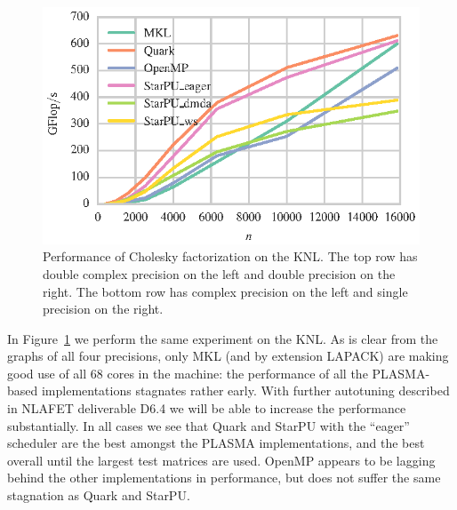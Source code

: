 \documentclass[a4paper,12pt]{article}
\begin{document}
\begin{figure}[t]
  \includegraphics[scale=.85]{fig/knl_ram_spotrf_weak_scaling.eps}
  \caption{Performance of Cholesky factorization on the KNL.
    The top row has double complex precision on the left and double
    precision on the right.
    The bottom row has complex precision on the left and single
    precision on the right.}
  \label{fig.chol_knl_ram}
\end{figure}

In Figure~\ref{fig.chol_knl_ram} we perform the same experiment
on the KNL.
As is clear from the graphs of all four precisions,
only MKL (and by extension LAPACK)
are making good use of all $68$ cores in the machine:
the performance of all the PLASMA-based implementations
stagnates rather early.
With further autotuning described in NLAFET deliverable D6.4
we will be able to increase the performance substantially.
In all cases we see that Quark and StarPU with the ``eager''
scheduler are the best amongst the PLASMA implementations,
and the best overall until the largest test matrices are used.
OpenMP appears to be lagging behind the other implementations
in performance,
but does not suffer the same stagnation as Quark and StarPU.

\end{document}
